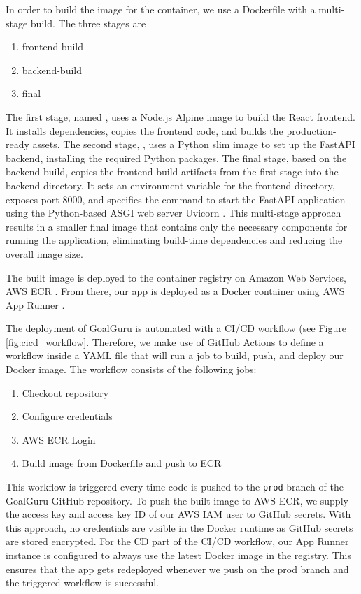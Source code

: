 \documentclass[conference,a4paper,flushend]{cs-techrep}
\begin{document}
In order to build the image for the container, we use a Dockerfile with a multi-stage build. The three stages are
\begin{enumerate}
\item frontend-build
\item backend-build
\item final
\end{enumerate}
The first stage, named , uses a Node.js Alpine image to build the React frontend. It installs dependencies, copies the frontend code, and builds the production-ready assets. The second stage, , uses a Python slim image to set up the FastAPI backend, installing the required Python packages. The final stage, based on the backend build, copies the frontend build artifacts from the first stage into the backend directory. It sets an environment variable for the frontend directory, exposes port 8000, and specifies the command to start the FastAPI application using the Python-based ASGI web server Uvicorn \cite{uvicorn}. This multi-stage approach results in a smaller final image that contains only the necessary components for running the application, eliminating build-time dependencies and reducing the overall image size.

The built image is deployed to the container registry on Amazon Web Services, AWS ECR \cite{noauthor_vollstandig_nodate}. From there, our app is deployed as a Docker container using AWS App Runner \cite{noauthor_verwalteter_nodate}. 

The deployment of GoalGuru is automated with a CI/CD workflow (see Figure \ref{fig:cicd_workflow}. Therefore, we make use of GitHub Actions \cite{noauthor_github_nodate} to define a workflow inside a YAML file that will run a job to build, push, and deploy our Docker image. The workflow consists of the following jobs:
\begin{enumerate}
\item Checkout repository
\item Configure credentials
\item AWS ECR Login
\item Build image from Dockerfile and push to ECR
\end{enumerate}
This workflow is triggered every time code is pushed to the \texttt{prod} branch of the GoalGuru GitHub repository. To push the built image to AWS ECR, we supply the access key and access key ID of our AWS IAM user to GitHub secrets. With this approach, no credentials are visible in the Docker runtime as GitHub secrets are stored encrypted. For the CD part of the CI/CD workflow, our App Runner instance is configured to always use the latest Docker image in the registry. This ensures that the app gets redeployed whenever we push on the prod branch and the triggered workflow is successful. 
\end{document}
